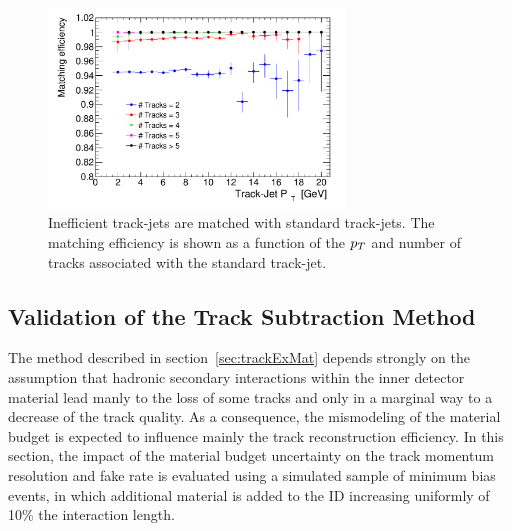 \begin{figure}[tp]
\centering
\includegraphics[width=0.7\textwidth]{figure/trackjet/T7/Sys_eff_n2.pdf}
\caption{Inefficient track-jets are matched with standard track-jets. The matching efficiency is shown as a function of 
	the $p_{T}$ and number of tracks associated with the  standard track-jet.}

\label{fig:inef_tj_std_eff}
\end{figure}    


\subsection{Validation of the Track Subtraction Method} %
\label{sec:valid}
The method described in section~\ref{sec:trackExMat} depends strongly on the assumption that 
hadronic secondary interactions within the inner detector material  lead manly to the loss of 
some tracks and only in a marginal way to a decrease of the track quality. As a consequence, the mismodeling 
of the material budget is expected to influence mainly the track reconstruction efficiency.
In this section, the impact  of the  material budget uncertainty on the track momentum resolution 
and fake rate is evaluated using a simulated  sample of minimum bias events, in which additional material 
is added to the ID increasing uniformly of 10\% the interaction length.  

